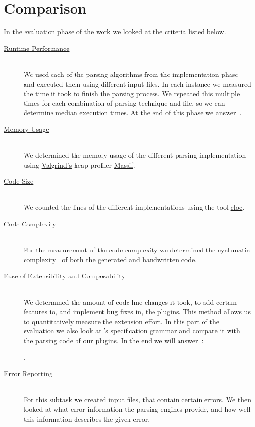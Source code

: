 \chapter{Comparison}
\label{sec:comparison}

In the evaluation phase of the work we looked at the criteria listed below.

\begin{description}

  \item[{\hyperref[sec:run_time_performance]{Runtime Performance}}]~\\[0.1cm]
  We used each of the parsing algorithms from the implementation phase and executed them using different input files. In each instance we measured the time it took to finish the parsing process. We repeated this multiple times for each combination of parsing technique and file, so we can determine median execution times. At the end of this phase we answer~.

  \speed*

  \item[{\hyperref[sec:memory_usage]{Memory Usage}}]~\\[0.1cm]
  We determined the memory usage of the different parsing implementation using \href{http://valgrind.org}{Valgrind's} heap profiler \href{http://valgrind.org/docs/manual/ms-manual.html}{Massif}.

  \item[{\hyperref[sec:code_size]{Code Size}}]~\\[0.1cm]
  We counted the lines of the different implementations using the tool \href{https://github.com/AlDanial/cloc}{cloc}.

  \item[{\hyperref[sec:code_complexity]{Code Complexity}}]~\\[0.1cm]
  For the measurement of the code complexity we determined the cyclomatic complexity~\cite{mccabe1976complexity} of both the generated and handwritten code.

  \item[{\hyperref[sec:extensibility]{Ease of Extensibility and Composability}}]~\\[0.1cm]
  We determined the amount of code line changes it took, to add certain features to, and implement bug fixes in, the  plugins. This method allows us to quantitatively measure the extension effort. In this part of the evaluation we also look at ’s specification grammar and compare it with the parsing code of our plugins. In the end we will answer~:

  \closeness*

  .

  \item[{\hyperref[sec:error_reporting]{Error Reporting}}]~\\[0.1cm]
  For this subtask we created  input files, that contain certain errors. We then looked at what error information the parsing engines provide, and how well this information describes the given error.

\end{description}

